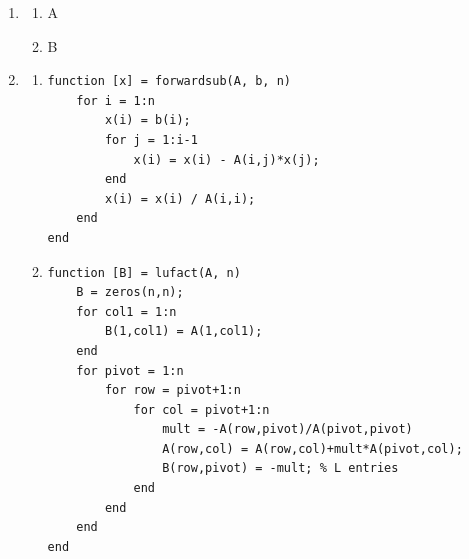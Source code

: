 \documentclass[12pt, letterpaper]{article}
\begin{document}
\begin{enumerate}
\begin{align*}
\begin{bmatrix}
                0      & a_{22}-\frac{a_{12}}{a_{11}}a_{12} & a_{23}-\frac{a_{13}}{a_{11}}a_{12} & \cdots & a_{2n}-\frac{a_{1n}}{a_{11}}a_{12} \\
                0      & a_{23}-\frac{a_{13}}{a_{11}}a_{12} & a_{33}   -\frac{a_{13}}{a_{11}}a_{12} & \cdots & a_{3n}-\frac{a_{1n}}{a_{11}}a_{12} \\
                \vdots & \vdots & \vdots & \ddots & \vdots \\
                0      & a_{2n}-\frac{a_{1n}}{a_{11}}a_{12} & a_{3n}-\frac{a_{1n}}{a_{11}}a_{12} & \cdots & a_{nn}-\frac{a_{1n}}{a_{11}}a_{12}
            \end{bmatrix} \\
            \therefore c_{ij} = c_{ji} \text{ for } 2\le i,j \le n
        \end{align*}
    \item %
        \begin{enumerate}
            \item A
            \item B
        \end{enumerate}
    \item %
        \begin{enumerate}
            \item 
                \begin{verbatim}
function [x] = forwardsub(A, b, n)
    for i = 1:n
        x(i) = b(i);
        for j = 1:i-1
            x(i) = x(i) - A(i,j)*x(j);
        end
        x(i) = x(i) / A(i,i);
    end
end
                \end{verbatim}
            \item
                \begin{verbatim}
function [B] = lufact(A, n)
    B = zeros(n,n);
    for col1 = 1:n
        B(1,col1) = A(1,col1);
    end
    for pivot = 1:n
        for row = pivot+1:n
            for col = pivot+1:n
                mult = -A(row,pivot)/A(pivot,pivot)
                A(row,col) = A(row,col)+mult*A(pivot,col);
                B(row,pivot) = -mult; % L entries
            end
        end
    end
end
                \end{verbatim}
        \end{enumerate}
\end{enumerate}
\end{document}
